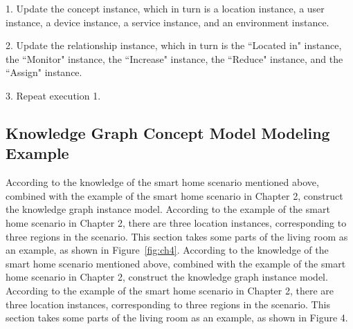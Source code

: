 1. Update the concept instance, which in turn is a location instance, a user instance, a device instance, a service instance, and an environment instance.

2. Update the relationship instance, which in turn is the ``Located in" instance, the ``Monitor" instance, the ``Increase" instance, the ``Reduce" instance, and the ``Assign" instance.

3. Repeat execution 1.

\subsection{Knowledge Graph Concept Model Modeling Example}

According to the knowledge of the smart home scenario mentioned above, combined with the example of the smart home scenario in Chapter 2, construct the knowledge graph instance model. According to the example of the smart home scenario in Chapter 2, there are three location instances, corresponding to three regions in the scenario. This section takes some parts of the living room as an example, as shown in Figure~\ref{fig:ch4}.
According to the knowledge of the smart home scenario mentioned above, combined with the example of the smart home scenario in Chapter 2, construct the knowledge graph instance model. According to the example of the smart home scenario in Chapter 2, there are three location instances, corresponding to three regions in the scenario. This section takes some parts of the living room as an example, as shown in Figure 4.
